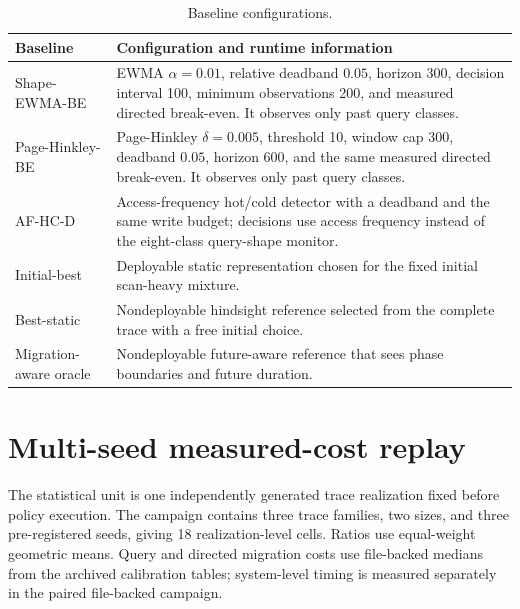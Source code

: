 \documentclass[preprint,12pt,authoryear]{elsarticle}
\begin{document}
\begin{table}[H]
\centering
\caption{Baseline configurations.}
\begin{tabularx}{\textwidth}{@{}lX@{}}
\toprule
Baseline & Configuration and runtime information \\
\midrule
Shape-EWMA-BE & EWMA $\alpha=0.01$, relative deadband $0.05$, horizon 300, decision interval 100, minimum observations 200, and measured directed break-even. It observes only past query classes. \\
Page-Hinkley-BE & Page-Hinkley $\delta=0.005$, threshold 10, window cap 300, deadband $0.05$, horizon 600, and the same measured directed break-even. It observes only past query classes. \\
AF-HC-D & Access-frequency hot/cold detector with a deadband and the same write budget; decisions use access frequency instead of the eight-class query-shape monitor. \\
Initial-best & Deployable static representation chosen for the fixed initial scan-heavy mixture. \\
Best-static & Nondeployable hindsight reference selected from the complete trace with a free initial choice. \\
Migration-aware oracle & Nondeployable future-aware reference that sees phase boundaries and future duration. \\
\bottomrule
\end{tabularx}
\end{table}

\section{Multi-seed measured-cost replay}

The statistical unit is one independently generated trace realization fixed before policy execution. The campaign contains three trace families, two sizes, and three pre-registered seeds, giving 18 realization-level cells. Ratios use equal-weight geometric means. Query and directed migration costs use file-backed medians from the archived calibration tables; system-level timing is measured separately in the paired file-backed campaign.
\end{document}
